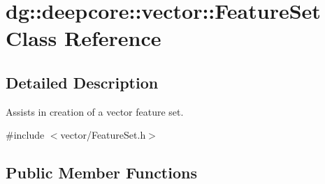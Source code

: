 \hypertarget{classdg_1_1deepcore_1_1vector_1_1_feature_set}{}\section{dg\+:\+:deepcore\+:\+:vector\+:\+:Feature\+Set Class Reference}
\label{classdg_1_1deepcore_1_1vector_1_1_feature_set}


\subsection{Detailed Description}
Assists in creation of a vector feature set. 

{\ttfamily \#include $<$vector/\+Feature\+Set.\+h$>$}

\subsection*{Public Member Functions}
